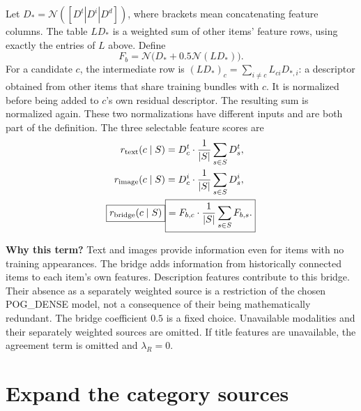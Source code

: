 \documentclass[11pt,a4paper]{article}
\newcommand{\N}{\mathcal N}\newcommand{\sd}{\operatorname{sd}}
\newcommand{\why}{\par\textbf{Why this term?} }
\numberwithin{equation}{section}
\begin{document}
Let $D_* =\N([D^t|D^i|D^d])$, where brackets mean concatenating feature columns.
The table $LD_*$ is a weighted sum of other items' feature rows, using exactly the entries of $L$ above. Define
\begin{equation}
 F_b=\N\bigl(D_*+0.5\N(LD_*)\bigr).
\end{equation}
For a candidate $c$, the intermediate row is
$(LD_*)_c=\sum_{i\ne c}L_{ci}D_{*,i}$: a descriptor obtained from other items
that share training bundles with $c$. It is normalized before being added to
$c$'s own residual descriptor. The resulting sum is normalized again. These two
normalizations have different inputs and are both part of the definition.
The three selectable feature scores are
\begin{align}
 r_{\rm text}(c\mid S)&=D^t_c\cdot\frac1{|S|}\sum_{s\in S}D^t_s,\\
 r_{\rm image}(c\mid S)&=D^i_c\cdot\frac1{|S|}\sum_{s\in S}D^i_s,\\
 \boxed{r_{\rm bridge}(c\mid S)}&\boxed{=F_{b,c}\cdot\frac1{|S|}\sum_{s\in S}F_{b,s}.}
\end{align}
\why Text and images provide information even for items with no training appearances.
The bridge adds information from historically connected items to each item's own features.
Description features contribute to this bridge. Their absence as a separately weighted source is a restriction of the chosen POG\_DENSE model, not a consequence of their being mathematically redundant. The bridge coefficient $0.5$ is a fixed choice. Unavailable modalities and their separately weighted sources are omitted. If title features are unavailable, the agreement term is omitted and $\lambda_R=0$.

\section{Expand the category sources}
\end{document}
